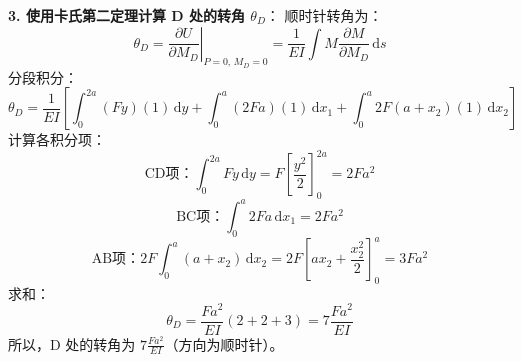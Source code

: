 \documentclass[11pt,a4paper]{ctexrep}
\newcommand{\diff}{\,\mathrm{d}}
\begin{document}
{\textbf{3. 使用卡氏第二定理计算 D 处的转角 $\theta_D$}：
顺时针转角为：
\[
    \theta_D = \left. \frac{\partial U}{\partial M_D} \right|_{P=0,\,M_D = 0} = \frac{1}{EI} \int M \frac{\partial M}{\partial M_D} \diff s
\]
分段积分：
\[
    \theta_D = \frac{1}{EI} \left[ \int_0^{2a} (Fy)(1) \diff y + \int_0^a (2Fa)(1) \diff x_1 + \int_0^a 2F(a + x_2)(1) \diff x_2 \right]
\]
计算各积分项：
\[
    \text{CD项：} \int_0^{2a} F y \diff y = F \left[ \frac{y^2}{2} \right]_0^{2a} = 2 F a^2
\]
\[
    \text{BC项：} \int_0^a 2 F a \diff x_1 = 2 F a^2
\]
\[
    \text{AB项：} 2F \int_0^a (a + x_2) \diff x_2 = 2F \left[ a x_2 + \frac{x_2^2}{2} \right]_0^a = 3 F a^2
\]
求和：
\[
    \theta_D = \frac{F a^2}{EI} (2 + 2 + 3) = 7 \frac{F a^2}{EI}
\]
所以，D 处的转角为 \textbf{$7 \frac{F a^2}{EI}$}（方向为顺时针）。


}
\end{document}
